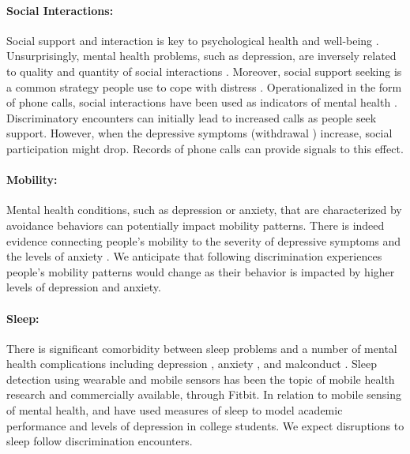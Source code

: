 \paragraph{Social Interactions:}
\label{sec:back-mhealth-socail}
Social support and interaction is key to psychological health and well-being \cite{Kawachi:2001}. Unsurprisingly, mental health problems, such as depression, are inversely related to quality and quantity of social interactions \cite{Nezlek:1994}. Moreover, social support seeking is a common strategy people use to cope with distress \cite{Carver:1997}. Operationalized in the form of phone calls, social interactions have been used as indicators of mental health \cite{Wang:2016}.   %
Discriminatory encounters can initially lead to increased calls as people seek support. However, when the depressive symptoms (\eg withdrawal \cite{Girard:2014}) increase, social participation might drop. Records of phone calls can provide signals to this effect. %

\paragraph{Mobility:}
\label{sec:back-mhealth-mobility}
Mental health conditions, such as depression or anxiety, that are characterized by avoidance behaviors can potentially impact mobility patterns. There is indeed evidence connecting people's mobility to the severity of depressive symptoms \cite{Saeb:2015, Saeb:2016} and the levels of anxiety \cite{Huang:2016}. We anticipate that following discrimination experiences people's mobility patterns would change as their behavior is impacted by higher levels of depression and anxiety.


\paragraph{Sleep:}
\label{sec:back-mhealth-sleep}
There is significant comorbidity between sleep problems and a number of mental health complications including depression \cite{Vandeputte:2003}, anxiety \cite{Morrison:1992}, and malconduct \cite{Papadimitriou:2005}. Sleep detection using wearable and mobile sensors has been the topic of mobile health research \cite{Min:2014} and commercially available, \eg through Fitbit. In relation to mobile sensing of mental health, \citet{wang2014studentlife} and \citet{Wang:2018} have used measures of sleep to model academic performance and levels of depression in college students. We expect disruptions to sleep follow discrimination encounters.


